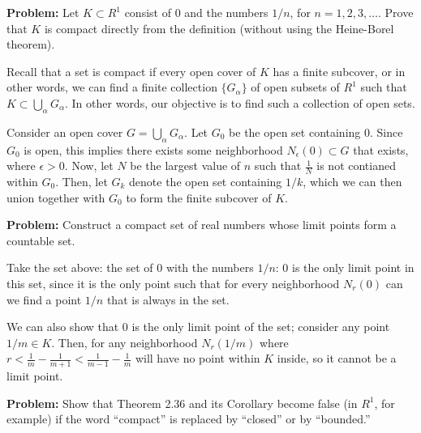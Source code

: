 \documentclass[10pt]{article}
\newenvironment{problem}{\textbf{Problem:}}{}
\begin{document}
	\begin{problem}
		Let \( K \subset R^{1} \) consist of \( 0 \) and the numbers \( 1/n \), for \( n = 1, 2, 3, \dots \). 
		Prove that \( K \) is compact directly from the definition (without using the Heine-Borel theorem). 
	\end{problem}

	\begin{solution}
		Recall that a set is compact if every open cover of \( K \) has a finite subcover, or in other words, we can 
		find a finite collection \( \{G_{\alpha}\}  \) of open subsets of \( R^{1} \) such that 
		\( K \subset \bigcup_\alpha G_\alpha \). In other words, our objective is to find such a collection 
		of open sets. 

		Consider an open cover \( G = \bigcup_\alpha G_\alpha  \). 
		Let \( G_0 \) be the open set containing 0. Since \( G_0 \) 
		is open, this implies there exists some neighborhood \( N_\epsilon(0) \subset G \) that exists, where 
		\( \epsilon > 0 \). Now, let \( N  \) be the largest value of \( n \) such that \( \frac{1}{N} \) is 
		not contianed within \( G_0 \). Then, let \( G_k \) denote the open set containing \( 1 / k \), which 
		we can then union together with \( G_0 \) to form the finite subcover of \( K \). 
	\end{solution}
	
	\begin{problem}
		Construct a compact set of real numbers whose limit points form a countable set.  
	\end{problem}

	\begin{solution}
		Take the set above: the set of 0 with the numbers \( 1 / n \): 0 is the only limit point in this set, since 
		it is the only point such that for every neighborhood \( N_r(0) \) can we find a point \( 1 / n \) that 
		is always in the set. 

		We can also show that 0 is the only limit point of the set; consider any point \( 1 / m \in K \). Then, 
		for any neighborhood \( N_r(1 / m) \) where \( r < \frac{1}{m} - \frac{1}{m+1} < \frac{1}{m-1} - 
		\frac{1}{m}\) will have no point 
		within \( K \) inside, so it cannot be a limit point. 
	\end{solution}

	\begin{problem}
		Show that Theorem 2.36 and its Corollary become false (in \( R^{1} \), for example) if the 
		word ``compact'' is replaced by ``closed'' or by ``bounded.''
	\end{problem}
\end{document}
